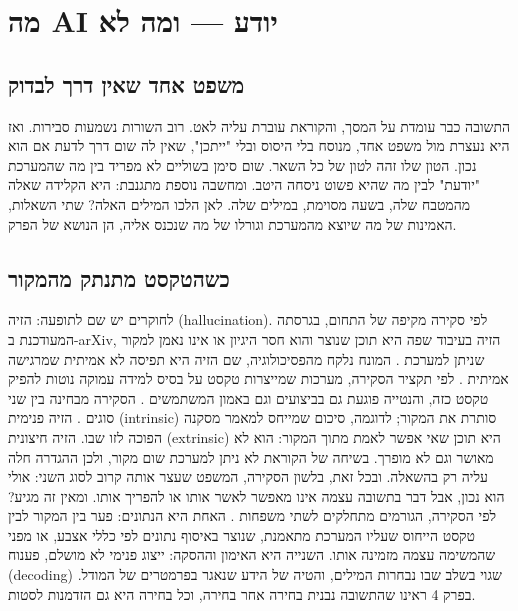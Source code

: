 \chapter{מה AI יודע — ומה לא}\label{ch:06}
\section{משפט אחד שאין דרך לבדוק}
התשובה כבר עומדת על המסך, והקוראת עוברת עליה לאט. רוב השורות נשמעות סבירות. ואז היא נעצרת מול משפט אחד, מנוסח בלי היסוס ובלי "ייתכן", שאין לה שום דרך לדעת אם הוא נכון. הטון שלו זהה לטון של כל השאר. שום סימן בשוליים לא מפריד בין מה שהמערכת "יודעת" לבין מה שהיא פשוט ניסחה היטב.
ומחשבה נוספת מתגנבת: היא הקלידה שאלה מהמטבח שלה, בשעה מסוימת, במילים שלה. לאן הלכו המילים האלה? שתי השאלות, האמינות של מה שיוצא מהמערכת וגורלו של מה שנכנס אליה, הן הנושא של הפרק.
\section{כשהטקסט מתנתק מהמקור}
לחוקרים יש שם לתופעה: הזיה (hallucination). לפי סקירה מקיפה של התחום, בגרסתה המעודכנת ב-arXiv, הזיה בעיבוד שפה היא תוכן שנוצר והוא חסר היגיון או אינו נאמן למקור שניתן למערכת \cite{S-ch06-02}. המונח נלקח מהפסיכולוגיה, שם הזיה היא תפיסה לא אמיתית שמרגישה אמיתית \cite{S-ch06-02}. לפי תקציר הסקירה, מערכות שמייצרות טקסט על בסיס למידה עמוקה נוטות להפיק טקסט כזה, והנטייה פוגעת גם בביצועים וגם באמון המשתמשים \cite{S-ch06-01}.
הסקירה מבחינה בין שני סוגים \cite{S-ch06-02}. הזיה פנימית (intrinsic) סותרת את המקור; לדוגמה, סיכום שמייחס למאמר מסקנה הפוכה לזו שבו. הזיה חיצונית (extrinsic) היא תוכן שאי אפשר לאמת מתוך המקור: הוא לא מאושר וגם לא מופרך. בשיחה של הקוראת לא ניתן למערכת שום מקור, ולכן ההגדרה חלה עליה רק בהשאלה. ובכל זאת, בלשון הסקירה, המשפט שעצר אותה קרוב לסוג השני: אולי הוא נכון, אבל דבר בתשובה עצמה אינו מאפשר לאשר אותו או להפריך אותו.
ומאין זה מגיע? לפי הסקירה, הגורמים מתחלקים לשתי משפחות \cite{S-ch06-02}. האחת היא הנתונים: פער בין המקור לבין טקסט הייחוס שעליו המערכת מתאמנת, שנוצר באיסוף נתונים לפי כללי אצבע, או מפני שהמשימה עצמה מזמינה אותו. השנייה היא האימון וההסקה: ייצוג פנימי לא מושלם, פענוח (decoding) שגוי בשלב שבו נבחרות המילים, והטיה של הידע שנאגר בפרמטרים של המודל. בפרק 4 ראינו שהתשובה נבנית בחירה אחר בחירה, וכל בחירה היא גם הזדמנות לסטות.
